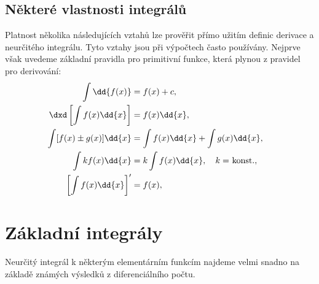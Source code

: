     \subsection{Některé vlastnosti integrálů}  
      Platnost několika následujících vztahů lze prověřit přímo užitím deﬁnic derivace a neurčitého
      integrálu. Tyto vztahy jsou při výpočtech často používány. Nejprve však uvedeme základní
      pravidla pro primitivní funkce, která plynou z pravidel pro derivování:
      \begin{subequations}
        \begin{flalign}
          \int\dd{f(x)} &= f(x) + c,                                          &\label{mai:eq134} \\
          \dxd\left[\int f(x)\dd{x}\right] &= f(x)\dd{x},                     &\label{mai:eq135} \\
          \int[f(x)\pm g(x)]\dd{x}&= \int f(x)\dd{x} + \int g(x)\dd{x},       &\label{mai:eq103} \\
          \int kf(x)\dd{x}      &=k\int f(x)\dd{x},\quad\text{\(k=\) konst.}, &\label{mai:eq104} \\
          \left[\int f(x)\dd{x}\right]' &= f(x),                              &\label{mai:eq136}
        \end{flalign}
      \end{subequations}
      
  \section{Základní integrály}\label{mai:IchapVIIsecII} 
    Neurčitý integrál k některým elementárním funkcím najdeme velmi snadno na základě známých
    výsledků z diferenciálního počtu.
    
